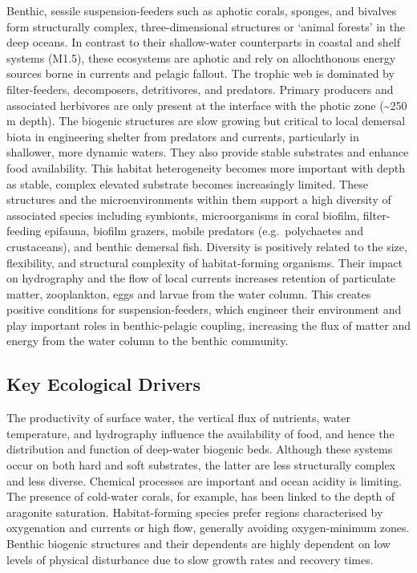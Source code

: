 \documentclass[
  letterpaper,
  DIV=11,
  numbers=noendperiod]{scrartcl}
\begin{document}
Benthic, sessile suspension-feeders such as aphotic corals, sponges, and
bivalves form structurally complex, three-dimensional structures or
`animal forests' in the deep oceans. In contrast to their shallow-water
counterparts in coastal and shelf systems (M1.5), these ecosystems are
aphotic and rely on allochthonous energy sources borne in currents and
pelagic fallout. The trophic web is dominated by filter-feeders,
decomposers, detritivores, and predators. Primary producers and
associated herbivores are only present at the interface with the photic
zone (\textasciitilde250 m depth). The biogenic structures are slow
growing but critical to local demersal biota in engineering shelter from
predators and currents, particularly in shallower, more dynamic waters.
They also provide stable substrates and enhance food availability. This
habitat heterogeneity becomes more important with depth as stable,
complex elevated substrate becomes increasingly limited. These
structures and the microenvironments within them support a high
diversity of associated species including symbionts, microorganisms in
coral biofilm, filter-feeding epifauna, biofilm grazers, mobile
predators (e.g.~polychaetes and crustaceans), and benthic demersal fish.
Diversity is positively related to the size, flexibility, and structural
complexity of habitat-forming organisms. Their impact on hydrography and
the flow of local currents increases retention of particulate matter,
zooplankton, eggs and larvae from the water column. This creates
positive conditions for suspension-feeders, which engineer their
environment and play important roles in benthic-pelagic coupling,
increasing the flux of matter and energy from the water column to the
benthic community.

\subsection{Key Ecological Drivers}\label{key-ecological-drivers-44}

The productivity of surface water, the vertical flux of nutrients, water
temperature, and hydrography influence the availability of food, and
hence the distribution and function of deep-water biogenic beds.
Although these systems occur on both hard and soft substrates, the
latter are less structurally complex and less diverse. Chemical
processes are important and ocean acidity is limiting. The presence of
cold-water corals, for example, has been linked to the depth of
aragonite saturation. Habitat-forming species prefer regions
characterised by oxygenation and currents or high flow, generally
avoiding oxygen-minimum zones. Benthic biogenic structures and their
dependents are highly dependent on low levels of physical disturbance
due to slow growth rates and recovery times.
\end{document}
